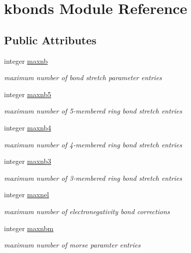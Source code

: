 \hypertarget{classkbonds}{\section{kbonds Module Reference}
\label{classkbonds}
}
\subsection*{Public Attributes}
\begin{DoxyCompactItemize}
\item 
integer \hyperlink{classkbonds_ae14cb6057f6b902041d325f442bb4eb4}{maxnb}
\begin{DoxyCompactList}\small\item\em maximum number of bond stretch parameter entries \end{DoxyCompactList}\item 
integer \hyperlink{classkbonds_ac0a19701e66f2ba2a514010e46f3e21f}{maxnb5}
\begin{DoxyCompactList}\small\item\em maximum number of 5-\/membered ring bond stretch entries \end{DoxyCompactList}\item 
integer \hyperlink{classkbonds_a1146d8cd8643971889024141fc7b1278}{maxnb4}
\begin{DoxyCompactList}\small\item\em maximum number of 4-\/membered ring bond stretch entries \end{DoxyCompactList}\item 
integer \hyperlink{classkbonds_aa8e2e75495d2bb801b4ee3410c933ba1}{maxnb3}
\begin{DoxyCompactList}\small\item\em maximum number of 3-\/membered ring bond stretch entries \end{DoxyCompactList}\item 
integer \hyperlink{classkbonds_a6db85c30f12f7ced42381f0176090d23}{maxnel}
\begin{DoxyCompactList}\small\item\em maximum number of electronegativity bond corrections \end{DoxyCompactList}\item 
integer \hyperlink{classkbonds_a479b8df9e16642b87303fc1f3bd06d26}{maxnbm}
\begin{DoxyCompactList}\small\item\em maximum number of morse paramter entries \end{DoxyCompactList}\item 

\end{DoxyCompactItemize}
